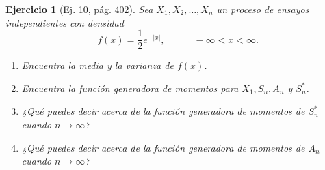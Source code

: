 \documentclass[12pt,letterpaper]{article}
\newtheorem{ej}{Ejercicio}
\begin{document}
\begin{ej}[Ej. 10, pág. 402] 
Sea $X_1, X_2, \ldots, X_n$ un proceso de ensayos independientes con densidad 
\begin{equation}
f(x)= \frac{1}{2}e^{-|x|}, \qquad \quad -\infty < x < \infty.
\end{equation}
\begin{enumerate}
\item[(a)] Encuentra la media y la varianza de $f(x)$.
\item[(b)] Encuentra la función generadora de momentos para $X_1, S_n, A_n$ y $S^*_n$.
\item[(c)] ¿Qué puedes decir acerca de la función generadora de momentos de $S^*_n$ cuando $n\rightarrow \infty$?
\item[(d)] ¿Qué puedes decir acerca de la función generadora de momentos de $A_n$ cuando $n\rightarrow \infty$?
\end{enumerate}
\end{ej}
\end{document}
